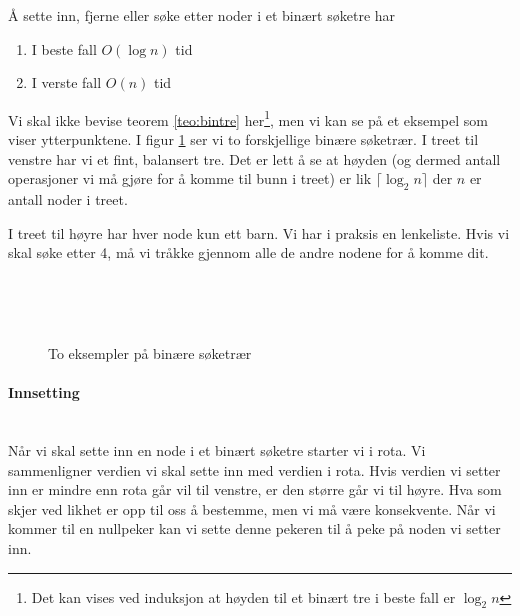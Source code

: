 \begin{theorem}
\label{teo:bintre}
Å sette inn, fjerne eller søke etter noder i et binært søketre har
\begin{enumerate}[i]
\item I beste fall $ O(\log n) $ tid
\item I verste fall $ O(n) $ tid
\end{enumerate}
\end{theorem}

Vi skal ikke bevise teorem \ref{teo:bintre} her\footnote{Det kan vises ved induksjon at høyden til et binært tre i beste fall er $ \log_2 n $}, men vi kan se på et eksempel som viser ytterpunktene. I figur \ref{fig:bintre} ser vi to forskjellige binære søketrær. I treet til venstre har vi et fint, balansert tre. Det er lett å se at høyden (og dermed antall operasjoner vi må gjøre for å komme til bunn i treet) er lik $ \lceil \log_2 n \rceil $ der $ n $ er antall noder i treet.

I treet til høyre har hver node kun ett barn. Vi har i praksis en lenkeliste. Hvis vi skal søke etter 4, må vi tråkke gjennom alle de andre nodene for å komme dit. 

\begin{figure}[H]
\caption{To eksempler på binære søketrær}
\label{fig:bintre}
\centering
~\\
$ \quad\quad $
\end{figure}




\paragraph{Innsetting}~\\
Når vi skal sette inn en node i et binært søketre starter vi i rota. Vi sammenligner verdien vi skal sette inn med verdien i rota. Hvis verdien vi setter inn er mindre enn rota går vil til venstre, er den større går vi til høyre. Hva som skjer ved likhet er opp til oss å bestemme, men vi må være konsekvente. Når vi kommer til en nullpeker kan vi sette denne pekeren til å peke på noden vi setter inn.

